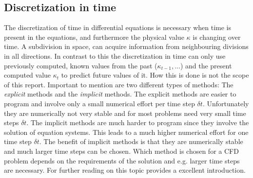 \subsection{Discretization in time}
The discretization of time in differential equations is necessary when time is present in the equations, and furthermore the physical value $ \kappa $ is changing over time.
A subdivision in space, can acquire information from neighbouring divisions in all directions. In contrast to this the discretization in time can only use previously
computed, known values from the past ($ \kappa_{t-1} , ... $) and the present computed value  $ \kappa_{t} $ to predict future values of it. How this is done is not the scope of this
report. Important to mention are two different types of methods: The \emph{explicit} methods and the \emph{implicit} methods. The explicit methods are easier to program
and involve only a small numerical effort per time step $ \delta t $. Unfortunately they are numerically not very stable and for most problems need very small time steps $ \delta t $. The implicit methods are much harder to program since they involve the solution of equation systems. This leads to a much higher numerical effort for one time step $ \delta t $. The benefit of implicit methods is that they are numerically stable and much larger time steps can be chosen. Which method is chosen for a CFD problem depends on the requirements of the solution and e.g. larger time steps are necessary. For further reading on this topic \citep[pg.63]{Laurien2009} provides a excellent introduction.


